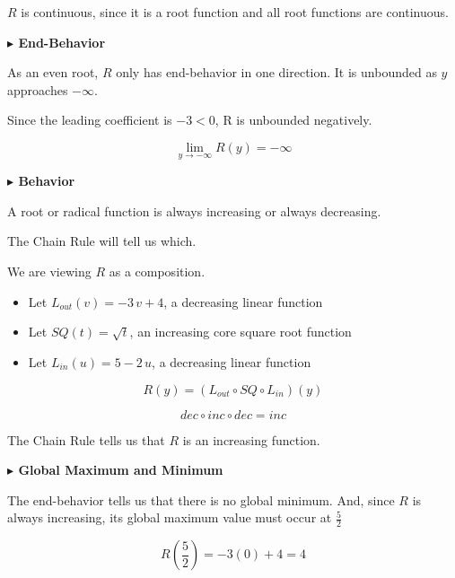\documentclass{ximera}
\begin{document}
\begin{example}
$R$ is continuous, since it is a root function and all root functions are continuous. 






\textbf{\textcolor{blue!55!black}{$\blacktriangleright$ End-Behavior}} 


As an even root, $R$ only has end-behavior in one direction. It is unbounded as $y$ approaches $-\infty$. 

Since the leading coefficient is $-3 < 0$, R is unbounded negatively. 


\[
\lim\limits_{y \to -\infty} R(y) = -\infty
\]












\textbf{\textcolor{blue!55!black}{$\blacktriangleright$ Behavior}} 


A root or radical function is always increasing or always decreasing. 

The Chain Rule will tell us which.


We are viewing $R$ as a composition.


\begin{itemize}
\item Let $L_{out}(v) = -3 \, v + 4$, a decreasing linear function
\item Let $SQ(t) = \sqrt{t}$, an increasing core square root function
\item Let $L_{in}(u) = 5 - 2 \, u$, a decreasing linear function
\end{itemize}

\[  R(y) = (L_{out} \circ SQ \circ L_{in})(y)  \]

\[ dec \circ inc \circ dec = inc \]

The Chain Rule tells us that $R$ is an increasing function.



\textbf{\textcolor{blue!55!black}{$\blacktriangleright$ Global Maximum and Minimum}} 



The end-behavior tells us that there is no global minimum. And, since $R$ is always increasing, its global maximum value must occur at $\frac{5}{2}$


\[
R\left( \frac{5}{2}\right) = -3 (0) + 4 = 4
\]










\end{example}
\end{document}
